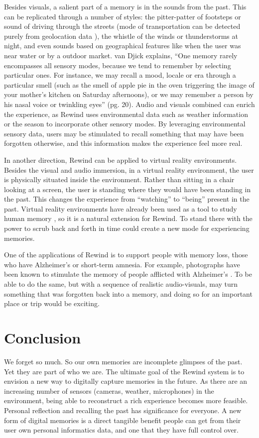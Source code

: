 \documentclass{sigchi}
\begin{document}
Besides visuals, a salient part of a memory is in the sounds from the past. This can be replicated through a number of styles: the pitter-patter of footsteps or sound of driving through the streets (mode of transportation can be detected purely from geolocation data \cite{zheng2008learning}), the whistle of the winds or thunderstorms at night, and even sounds based on geographical features like when the user was near water or by a outdoor market. van Djick explains, ``One memory rarely encompasses all sensory modes, because we tend to remember by selecting particular ones. For instance, we may recall a mood, locale or era through a particular smell (such as the smell of apple pie in the oven triggering the image of your mother's kitchen on Saturday afternoons), or we may remember a person by his nasal voice or twinkling eyes'' \cite{van2007mediated} (pg. 20). Audio and visuals combined can enrich the experience, as Rewind uses environmental data such as weather information or the season to incorporate other sensory modes. By leveraging environmental sensory data, users may be stimulated to recall something that may have been forgotten otherwise, and this information makes the experience feel more real.

In another direction, Rewind can be applied to virtual reality environments. Besides the visual and audio immersion, in a virtual reality environment, the user is physically situated inside the environment. Rather than sitting in a chair looking at a screen, the user is standing where they would have been standing in the past. This changes the experience from ``watching'' to ``being'' present in the past. Virtual reality environments have already been used as a tool to study human memory \cite{gamberini2000virtual}, so it is a natural extension for Rewind. To stand there with the power to scrub back and forth in time could create a new mode for experiencing memories.

One of the applications of Rewind is to support people with memory loss, those who have Alzheimer's or short-term amnesia. For example, photographs have been known to stimulate the memory of people afflicted with Alzheimer's \cite{grandmaison2003critical}. To be able to do the same, but with a sequence of realistic audio-visuals, may turn something that was forgotten back into a memory, and doing so for an important place or trip would be exciting.

\section{Conclusion}
We forget so much. So our own memories are incomplete glimpses of the past. Yet they are part of who we are. The ultimate goal of the Rewind system is to envision a new way to digitally capture memories in the future. As there are an increasing number of sensors (cameras, weather, microphones) in the environment, being able to reconstruct a rich experience becomes more feasible. Personal reflection and recalling the past has significance for everyone. A new form of digital memories is a direct tangible benefit people can get from their user own personal informatics data, and one that they have full control over.
\end{document}

